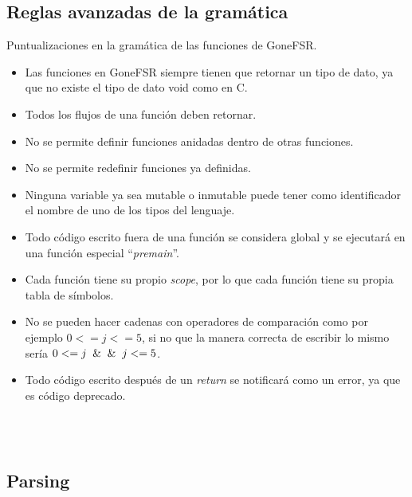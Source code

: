 \subsection{Reglas avanzadas de la gramática}
Puntualizaciones en la gramática de las funciones de GoneFSR. 
\begin{itemize}
    \item{Las funciones en GoneFSR siempre tienen que retornar un tipo de dato, ya que no existe el tipo de dato void como en C.}
    \item{Todos los flujos de una función deben retornar.}
    \item{No se permite definir funciones anidadas dentro de otras funciones.  }
    \item{No se permite redefinir funciones ya definidas.}
    \item{Ninguna variable ya sea mutable o inmutable puede tener como identificador el nombre de uno de los tipos del lenguaje.}
    \item{Todo código escrito fuera de una función se considera global y se ejecutará en una función especial ``\textit{premain}''.}
    \item{Cada función tiene su propio \textit{scope}, por lo que cada función tiene su propia tabla de símbolos.}
    \item{No se pueden hacer cadenas con operadores de comparación como por ejemplo $0<=j<=5$, si no que la manera correcta de escribir lo mismo sería $0<=j \And\And j<=5$.}
    \item{Todo código escrito después de un \textit{return} se notificará como un error, ya que es código deprecado.}\\
\end{itemize}


\\\\
\subsection{Parsing}


